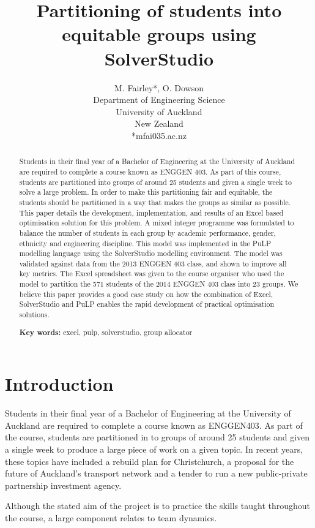 \documentclass[12pt]{ORSNZ}
\title{Partitioning of students into equitable groups using SolverStudio}
\author{M. Fairley*, O. Dowson\\Department of Engineering Science\\University of
  Auckland\\New Zealand\\{*}mfai035\@@aucklanduni.ac.nz}
\date{} %
\begin{document}
\maketitle
\pagestyle{empty} \thispagestyle{empty}
\begin{abstract}
Students in their final year of a Bachelor of Engineering at the University of Auckland are required to complete a course known as ENGGEN 403. As part of this course, students are partitioned into groups of around 25 students and given a single week to solve a large problem. In order to make this partitioning fair and equitable, the students should be partitioned in a way that makes the groups as similar as possible. This paper details the development, implementation, and results of an Excel based optimisation solution for this problem. A mixed integer programme was formulated to balance the number of students in each group by academic performance, gender, ethnicity and engineering discipline. This model was implemented in the PuLP modelling language using the SolverStudio modelling environment. The model was validated against data from the 2013 ENGGEN 403 class, and shown to improve all key metrics. The Excel spreadsheet was given to the course organiser who used the model to partition the 571 students of the 2014 ENGGEN 403 class into 23 groups. We believe this paper provides a good case study on how the combination of Excel, SolverStudio and PuLP enables the rapid development of practical optimisation solutions.

\textbf{Key words:} excel, pulp, solverstudio, group allocator
\end{abstract}

\section{Introduction}
Students in their final year of a Bachelor of Engineering at the University of Auckland are required to complete a course known as ENGGEN403. As part of the course, students are partitioned in to groups of around 25 students and given a single week to produce a large piece of work on a given topic. In recent years, these topics have included a rebuild plan for Christchurch, a proposal for the future of Auckland’s transport network and a tender to run a new public-private partnership investment agency.

Although the stated aim of the project is to practice the skills taught throughout the course, a large component relates to team dynamics. 
\end{document}
